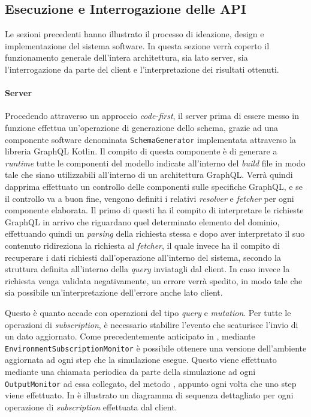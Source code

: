 \subsection{Esecuzione e Interrogazione delle API}\label{ssec:apis-functioning}
Le sezioni precedenti hanno illustrato il processo di ideazione, design e implementazione del sistema software. In questa sezione verrà coperto il funzionamento generale dell'intera
architettura, sia lato server, sia l'interrogazione da parte del client e l'interpretazione dei risultati ottenuti.

\paragraph{Server}
Procedendo attraverso un approccio \textit{code-first}, il server prima di essere messo in funzione effettua un'operazione di generazione dello schema, grazie ad una componente
software denominata \texttt{SchemaGenerator} implementata attraverso la libreria GraphQL Kotlin. Il compito di questa componente è di generare a \textit{runtime} tutte le componenti
del modello indicate all'interno del \textit{build} file in modo tale che siano utilizzabili all'interno di un architettura GraphQL. Verrà quindi dapprima effettuato un controllo
delle componenti sulle specifiche GraphQL, e se il controllo va a buon fine, vengono definiti i relativi \textit{resolver} e \textit{fetcher} per ogni componente elaborata.
Il primo di questi ha il compito di interpretare le richieste GraphQL in arrivo che riguardano quel determinato elemento del dominio, effettuando quindi un \textit{parsing}
della richiesta stessa e dopo aver interpretato il suo contenuto ridireziona la richiesta al \textit{fetcher}, il quale invece ha il compito di recuperare i dati
richiesti dall'operazione all'interno del sistema, secondo la struttura definita all'interno della \textit{query} inviatagli dal client. In caso invece la richiesta venga validata
negativamente, un errore verrà spedito, in modo tale che sia possibile un'interpretazione dell'errore anche lato client.

Questo è quanto accade con operazioni del tipo \textit{query} e \textit{mutation}. Per tutte le operazioni di \textit{subscription}, è necessario stabilire l'evento che scaturisce
l'invio di un dato aggiornato. Come precedentemente anticipato in , mediante \texttt{EnvironmentSubscriptionMonitor} è possibile ottenere una versione
dell'ambiente aggiornata ad ogni step che la simulazione esegue. Questo viene effettuato mediante una chiamata periodica da parte della simulazione ad ogni \texttt{OutputMonitor}
ad essa collegato, del metodo , appunto ogni volta che uno step viene effettuato. In  è illustrato un diagramma di sequenza dettagliato
per ogni operazione di \textit{subscription} effettuata dal client.

